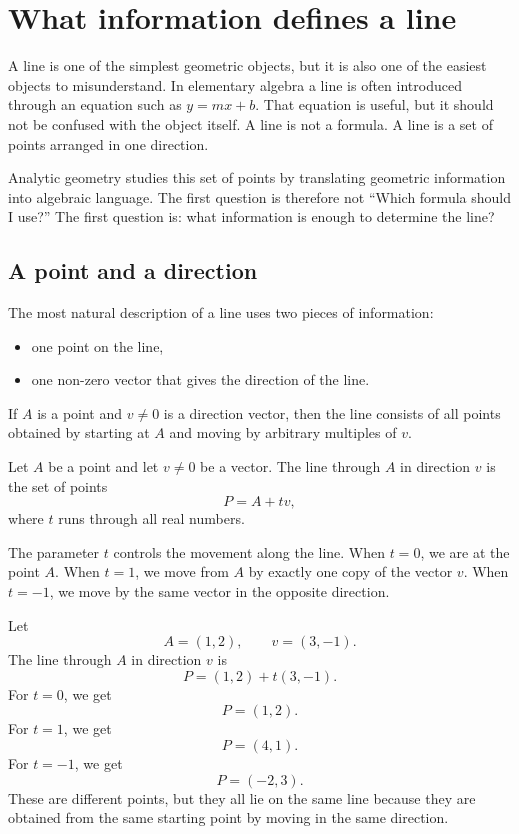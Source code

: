 \section{What information defines a line}

A line is one of the simplest geometric objects, but it is also one of the easiest objects to misunderstand. In elementary algebra a line is often introduced through an equation such as \(y=mx+b\). That equation is useful, but it should not be confused with the object itself. A line is not a formula. A line is a set of points arranged in one direction.

Analytic geometry studies this set of points by translating geometric information into algebraic language. The first question is therefore not ``Which formula should I use?'' The first question is: what information is enough to determine the line?

\subsection*{A point and a direction}

The most natural description of a line uses two pieces of information:
\begin{itemize}
\item one point on the line,
\item one non-zero vector that gives the direction of the line.
\end{itemize}

If \(A\) is a point and \(v\ne0\) is a direction vector, then the line consists of all points obtained by starting at \(A\) and moving by arbitrary multiples of \(v\).

\begin{definitionbox}
Let \(A\) be a point and let \(v\ne0\) be a vector. The line through \(A\) in direction \(v\) is the set of points
\[
P=A+t v,
\]
where \(t\) runs through all real numbers.
\end{definitionbox}

The parameter \(t\) controls the movement along the line. When \(t=0\), we are at the point \(A\). When \(t=1\), we move from \(A\) by exactly one copy of the vector \(v\). When \(t=-1\), we move by the same vector in the opposite direction.

\begin{examplebox}
Let
\[
A=(1,2),
\qquad
v=(3,-1).
\]
The line through \(A\) in direction \(v\) is
\[
P=(1,2)+t(3,-1).
\]
For \(t=0\), we get
\[
P=(1,2).
\]
For \(t=1\), we get
\[
P=(4,1).
\]
For \(t=-1\), we get
\[
P=(-2,3).
\]
These are different points, but they all lie on the same line because they are obtained from the same starting point by moving in the same direction.
\end{examplebox}

